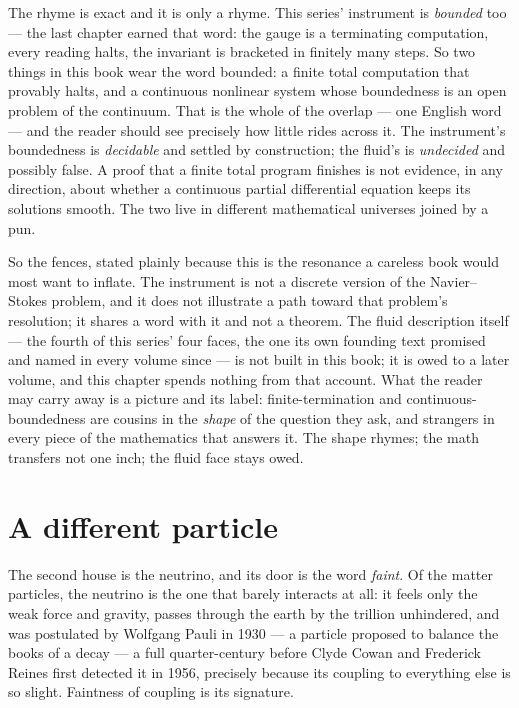 The rhyme is exact and it is only a rhyme. This series' instrument is
\emph{bounded} too --- the last chapter earned that word: the gauge is a
terminating computation, every reading halts, the invariant is bracketed
in finitely many steps. So two things in this book wear the word bounded:
a finite total computation that provably halts, and a continuous nonlinear
system whose boundedness is an open problem of the continuum. That is the
whole of the overlap --- one English word --- and the reader should see
precisely how little rides across it. The instrument's boundedness is
\emph{decidable} and settled by construction; the fluid's is
\emph{undecided} and possibly false. A proof that a finite total program
finishes is not evidence, in any direction, about whether a continuous
partial differential equation keeps its solutions smooth. The two live in
different mathematical universes joined by a pun.

So the fences, stated plainly because this is the resonance a careless book
would most want to inflate. The instrument is not a discrete version of the
Navier--Stokes problem, and it does not illustrate a path toward that
problem's resolution; it shares a word with it and not a theorem. The
fluid description itself --- the fourth of this series' four faces, the one
its own founding text promised and named in every volume since --- is not
built in this book; it is owed to a later volume, and this chapter spends
nothing from that account. What the reader may carry away is a picture and
its label: finite-termination and continuous-boundedness are cousins in the
\emph{shape} of the question they ask, and strangers in every piece of the
mathematics that answers it. The shape rhymes; the math transfers not one
inch; the fluid face stays owed.

\section*{A different particle}

The second house is the neutrino, and its door is the word \emph{faint}. Of
the matter particles, the neutrino is the one that barely interacts at all:
it feels only the weak force and gravity, passes through the earth by the
trillion unhindered, and was postulated by Wolfgang Pauli in 1930 --- a
particle proposed to balance the books of a decay --- a full quarter-century
before Clyde Cowan and Frederick Reines first detected it in 1956, precisely
because its coupling to everything else is so slight. Faintness of coupling
is its signature.

